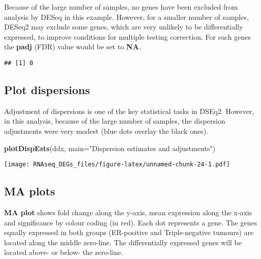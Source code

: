 \documentclass[]{book}
\newenvironment{Shaded}{\begin{snugshade}}{\end{snugshade}}
\newcommand{\KeywordTok}[1]{\textcolor[rgb]{0.13,0.29,0.53}{\textbf{#1}}}
\newcommand{\DataTypeTok}[1]{\textcolor[rgb]{0.13,0.29,0.53}{#1}}
\newcommand{\FloatTok}[1]{\textcolor[rgb]{0.00,0.00,0.81}{#1}}
\newcommand{\StringTok}[1]{\textcolor[rgb]{0.31,0.60,0.02}{#1}}
\newcommand{\OperatorTok}[1]{\textcolor[rgb]{0.81,0.36,0.00}{\textbf{#1}}}
\newcommand{\NormalTok}[1]{#1}
\begin{document}
Because of the large number of samples, no genes have been excluded from
analysis by DESeq in this example. However, for a smaller number of
samples, DESeq2 may exclude some genes, which are very unlikely to be
differentially expressed, to improve conditions for multiple testing
correction. For such genes the \textbf{padj} (FDR) value would be set to
\textbf{NA}.

\begin{Shaded}
\end{Shaded}

\begin{verbatim}
## [1] 0
\end{verbatim}

\subsection{Plot dispersions}\label{plot-dispersions}

Adjustment of dispersions is one of the key statistical tasks in DSEq2.
However, in this analysis, because of the large number of samples, the
dispersion adjustments were very modest (blue dots overlay the black
ones).

\begin{Shaded}
\begin{Highlighting}[]
\KeywordTok{plotDispEsts}\NormalTok{(ddx, }\DataTypeTok{main=}\StringTok{"Dispersion estimates and adjustments"}\NormalTok{)}
\end{Highlighting}
\end{Shaded}

\texttt{[image: RNAseq\_DEGs\_files/figure-latex/unnamed-chunk-24-1.pdf]}

\subsection{MA plots}\label{ma-plots}

\textbf{MA plot} shows fold change along the y-axis, mean expression
along the x-axis and significance by colour coding (in red). Each dot
represents a gene. The genes equally expressed in both groups
(ER-positive and Triple-negative tumours) are located along the middle
zero-line. The differentially expressed genes will be located above- or
below- the zero-line.
\end{document}
